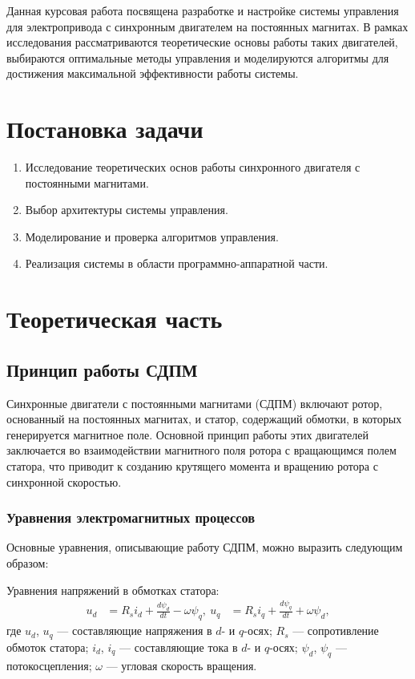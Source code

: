 \documentclass[a4paper,14pt]{extarticle} %
\begin{document}
Данная курсовая работа посвящена разработке и настройке системы управления для электропривода с синхронным двигателем на постоянных магнитах. В рамках исследования рассматриваются теоретические основы работы таких двигателей, выбираются оптимальные методы управления и моделируются алгоритмы для достижения максимальной эффективности работы системы.

\section*{Постановка задачи}

\begin{enumerate}
\item Исследование теоретических основ работы синхронного двигателя с постоянными магнитами.
\item Выбор архитектуры системы управления.
\item Моделирование и проверка алгоритмов управления.
\item Реализация системы в области программно-аппаратной части.
\end{enumerate}

\section*{Теоретическая часть}

\subsection*{Принцип работы СДПМ}

Синхронные двигатели с постоянными магнитами (СДПМ) включают ротор, основанный на постоянных магнитах, и статор, содержащий обмотки, в которых генерируется магнитное поле. Основной принцип работы этих двигателей заключается во взаимодействии магнитного поля ротора с вращающимся полем статора, что приводит к созданию крутящего момента и вращению ротора с синхронной скоростью.

\subsubsection*{Уравнения электромагнитных процессов}

Основные уравнения, описывающие работу СДПМ, можно выразить следующим образом:

Уравнения напряжений в обмотках статора:
\begin{equation}
\begin{aligned}
u_d &= R_s i_d + \frac{d\psi_d}{dt} - \omega \psi_q, \
u_q &= R_s i_q + \frac{d\psi_q}{dt} + \omega \psi_d,
\end{aligned}
\end{equation}
где $u_d$, $u_q$ — составляющие напряжения в $d$- и $q$-осях; $R_s$ — сопротивление обмоток статора; $i_d$, $i_q$ — составляющие тока в $d$- и $q$-осях; $\psi_d$, $\psi_q$ — потокосцепления; $\omega$ — угловая скорость вращения.
\end{document}
